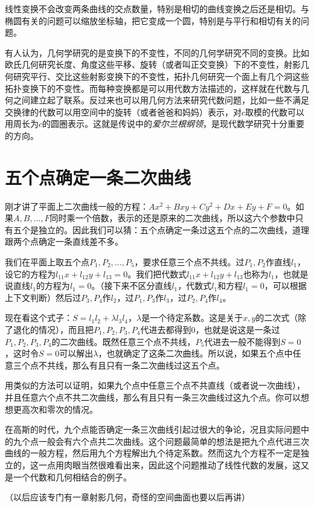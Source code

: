 线性变换不会改变两条曲线的交点数量，特别是相切的曲线变换之后还是相切。与椭圆有关的问题可以缩放坐标轴，把它变成一个圆，特别是与平行和相切有关的问题。

有人认为，几何学研究的是变换下的不变性，不同的几何学研究不同的变换。比如欧氏几何研究长度、角度这些平移、旋转（或者叫正交变换）下的不变性，射影几何研究平行、交比这些射影变换下的不变性，拓扑几何研究一个面上有几个洞这些拓扑变换下的不变性。而每种变换都是可以用代数方法描述的，这样就在代数与几何之间建立起了联系。反过来也可以用几何方法来研究代数问题，比如一些不满足交换律的代数可以用空间中的旋转（或者爸爸和妈妈）表示，对$c$取模的代数可以用周长为$c$的圆圈表示。这就是传说中的\emph{爱尔兰根纲领}，是现代数学研究十分重要的方向。
\section{五个点确定一条二次曲线}
刚才讲了平面上二次曲线一般的方程：$A x^2+B x y+C y^2+D x+E y+F=0$。如果$A,B,\dots,F$同时乘一个倍数，表示的还是原来的二次曲线，所以这六个参数中只有五个是独立的。因此我们可以猜：五个点确定一条过这五个点的二次曲线，道理跟两个点确定一条直线差不多。

我们在平面上取五个点$P_1,P_2,\dots,P_5$，要求任意三个点不共线。过$P_1,P_2$作直线$l_1$，设它的方程为$l_{1 1} x+l_{1 2} y+l_{1 3}=0$。我们把代数式$l_{1 1} x+l_{1 2} y+l_{1 3}$也称为$l_1$，也就是说直线$l_1$的方程为$l_1=0$。（接下来不区分直线$l_1$，代数式$l_1$和方程$l_1=0$，可以根据上下文判断）然后过$P_3,P_4$作$l_2$，过$P_1,P_3$作$l_3$，过$P_2,P_4$作$l_4$。

现在看这个式子：$S=l_1 l_2+\lambda l_3 l_4$，$\lambda$是一个待定系数。这是关于$x,y$的二次式（除了退化的情况），而且把$P_1,P_2,P_3,P_4$代进去都得到$0$，也就是说这是一条过$P_1,P_2,P_3,P_4$的二次曲线。既然任意三个点不共线，$P_5$代进去一般不能得到$S=0$，这时令$S=0$可以解出$\lambda$，也就确定了这条二次曲线。所以说，如果五个点中任意三个点不共线，那么有且只有一条二次曲线过这五个点。

用类似的方法可以证明，如果九个点中任意三个点不共直线（或者说一次曲线），并且任意六个点不共二次曲线，那么有且只有一条三次曲线过这九个点。你可以想想更高次和零次的情况。

在高斯的时代，九个点能否确定一条三次曲线引起过很大的争论，况且实际问题中的九个点一般会有六个点共二次曲线。这个问题最简单的想法是把九个点代进三次曲线的一般方程，然后用九个方程解出九个待定系数。然而这九个方程不一定是独立的，这一点用肉眼当然很难看出来，因此这个问题推动了线性代数的发展，这又是一个代数和几何相结合的例子。

（以后应该专门有一章射影几何，奇怪的空间曲面也要以后再讲）
